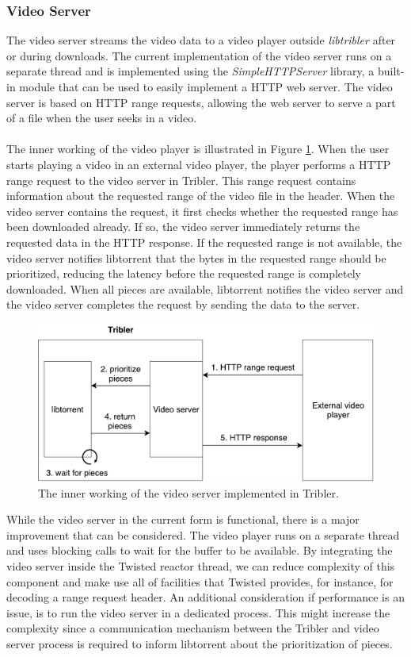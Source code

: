 \subsubsection{\textbf{Video Server}}
The video server streams the video data to a video player outside \emph{libtribler} after or during downloads. The current implementation of the video server runs on a separate thread and is implemented using the \emph{SimpleHTTPServer} library, a built-in module that can be used to easily implement a HTTP web server. The video server is based on HTTP range requests, allowing the web server to serve a part of a file when the user seeks in a video.\\\\
The inner working of the video player is illustrated in Figure \ref{fig:video-server}. When the user starts playing a video in an external video player, the player performs a HTTP range request to the video server in Tribler. This range request contains information about the requested range of the video file in the header. When the video server contains the request, it first checks whether the requested range has been downloaded already. If so, the video server immediately returns the requested data in the HTTP response. If the requested range is not available, the video server notifies libtorrent that the  bytes in the requested range should be prioritized, reducing the latency before the requested range is completely downloaded. When all pieces are available, libtorrent notifies the video server and the video server completes the request by sending the data to the server.\\

\begin{figure}[h!]
	\centering
	\includegraphics[width=0.7\columnwidth]{images/architecture/video_server}
	\caption{The inner working of the video server implemented in Tribler.}
	\label{fig:video-server}
\end{figure}

While the video server in the current form is functional, there is a major improvement that can be considered. The video player runs on a separate thread and uses blocking calls to wait for the buffer to be available. By integrating the video server inside the Twisted reactor thread, we can reduce complexity of this component and make use all of facilities that Twisted provides, for instance, for decoding a range request header. An additional consideration if performance is an issue, is to run the video server in a dedicated process. This might increase the complexity since a communication mechanism between the Tribler and video server process is required to inform libtorrent about the prioritization of pieces.

